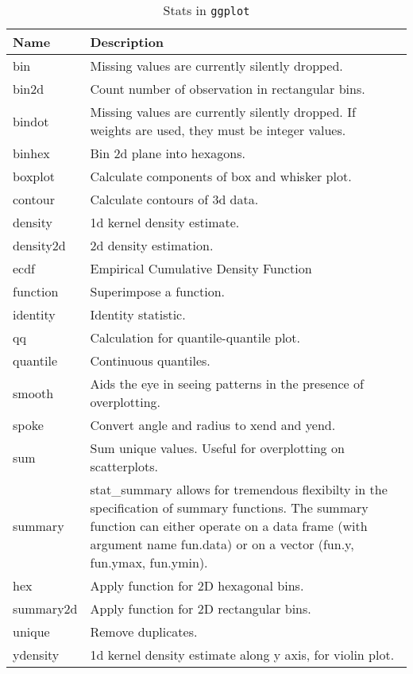 \begin{table}[ht]
\centering
\begin{tabular}{ll}
  \hline
Name & Description \\ 
  \hline
bin & Missing values are currently silently dropped. \\ 
  bin2d & Count number of observation in rectangular bins. \\ 
  bindot & Missing values are currently silently dropped. If weights are used, they must be integer values. \\ 
  binhex & Bin 2d plane into hexagons. \\ 
  boxplot & Calculate components of box and whisker plot. \\ 
  contour & Calculate contours of 3d data. \\ 
  density & 1d kernel density estimate. \\ 
  density2d & 2d density estimation. \\ 
  ecdf & Empirical Cumulative Density Function \\ 
  function & Superimpose a function. \\ 
  identity & Identity statistic. \\ 
  qq & Calculation for quantile-quantile plot. \\ 
  quantile & Continuous quantiles. \\ 
  smooth & Aids the eye in seeing patterns in the presence of overplotting. \\ 
  spoke & Convert angle and radius to xend and yend. \\ 
  sum & Sum unique values. Useful for overplotting on scatterplots. \\ 
  summary & stat\_summary allows for tremendous flexibilty in the specification of summary functions. The summary function can either operate on a data frame (with argument name fun.data) or on a vector (fun.y, fun.ymax, fun.ymin). \\ 
  hex & Apply function for 2D hexagonal bins. \\ 
  summary2d & Apply function for 2D rectangular bins. \\ 
  unique & Remove duplicates. \\ 
  ydensity & 1d kernel density estimate along y axis, for violin plot. \\ 
   \hline
\end{tabular}
\caption{Stats in \texttt{ggplot}} 
\label{stats}
\end{table}
